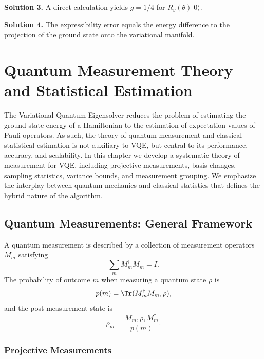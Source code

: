 \documentclass{book}
\begin{document}
\textbf{Solution 3.} A direct calculation yields $g = 1/4$ for $R_y(\theta)|0\rangle$.

\textbf{Solution 4.} The expressibility error equals the energy difference to the projection of the ground state onto the variational manifold.




\chapter{Quantum Measurement Theory and Statistical Estimation}

The Variational Quantum Eigensolver reduces the problem of estimating the ground-state energy of a Hamiltonian to the estimation of expectation values of Pauli operators. As such, the theory of quantum measurement and classical statistical estimation is not auxiliary to VQE, but central to its performance, accuracy, and scalability. In this chapter we develop a systematic theory of measurement for VQE, including projective measurements, basis changes, sampling statistics, variance bounds, and measurement grouping. We emphasize the interplay between quantum mechanics and classical statistics that defines the hybrid nature of the algorithm.

\section{Quantum Measurements: General Framework}

A quantum measurement is described by a collection of measurement operators ${M_m}$ satisfying
\begin{equation}
\sum_m M_m^\dagger M_m = I.
\end{equation}
The probability of outcome $m$ when measuring a quantum state $\rho$ is
\begin{equation}
p(m) = \Tr(M_m^\dagger M_m , \rho),
\end{equation}
and the post-measurement state is
\begin{equation}
\rho_m = \frac{M_m , \rho , M_m^\dagger}{p(m)}.
\end{equation}

\subsection{Projective Measurements}
\end{document}
